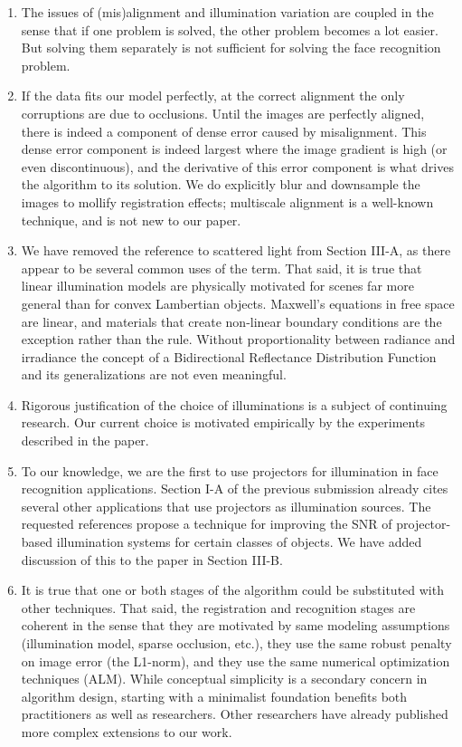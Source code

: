 \documentclass[11pt]{article}
\begin{document}
\begin{enumerate}
\item The issues of (mis)alignment and illumination variation are coupled in the
sense that if one problem is solved, the other problem becomes a lot easier. But solving them
separately is not sufficient for solving the face recognition problem.

\item If the data fits our model perfectly, at the correct alignment the only
corruptions are due to occlusions.  Until the images are perfectly aligned,
there is indeed a component of dense error caused by misalignment.  This dense
error component is indeed largest where the image gradient is high (or even
discontinuous), and the derivative of this error component is what drives the
algorithm to its solution.  We do explicitly  blur and downsample the images to
mollify registration effects; multiscale alignment is a well-known technique,
and is not new to our paper.

\item We have removed the reference to scattered light from Section III-A, as there appear to
be several common uses of the term.  That said, it is true that linear illumination
models are physically motivated for scenes far more general than for convex
Lambertian objects.  Maxwell's equations in free space are linear, and materials
that create non-linear boundary conditions are the exception
rather than the rule.  Without proportionality between radiance and irradiance
the concept of a Bidirectional Reflectance Distribution Function and its
generalizations are not even meaningful.

\item Rigorous justification of the choice of illuminations is a subject of
continuing research.  Our current choice is motivated empirically by the
experiments described in the paper.

\item To our knowledge, we are the first to use projectors for illumination in
face recognition applications.  Section I-A of the previous submission already
cites several other applications that use projectors as illumination sources.
The requested references propose a technique for improving the SNR of projector-based
illumination systems for certain classes of objects.  We have added
discussion of this to the paper in Section III-B.

\item  It is true that one or both stages of the algorithm could be substituted
with other techniques.  That said, the registration and recognition stages are
coherent in the sense that they are motivated by same modeling assumptions
(illumination model, sparse occlusion, etc.), they use the same robust penalty
on image error (the L1-norm), and they use the same numerical optimization
techniques (ALM).  While conceptual simplicity is a secondary concern in
algorithm design, starting with a minimalist foundation benefits both
practitioners as well as researchers.  Other researchers have already published
more complex extensions to our work.


\end{enumerate}
\end{document}
